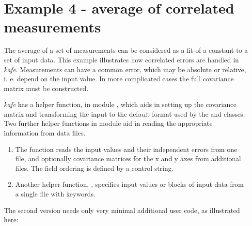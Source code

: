 \documentclass[a4paper,10pt,english]{sphinxmanual}
\begin{document}
\section{Example 4 - average of correlated measurements}
\label{index:example-4-average-of-correlated-measurements}
The average of a set of measurements can be considered as a fit
of a constant to a set of input data. This example illustrates
how correlated errors are handled in \emph{kafe}.
Measurements can have a common error, which may be absolute
or relative, i. e. depend on the input value.  In more complicated
cases the full covariance matrix must be constructed.

\emph{kafe} has a helper function,  in module ,
which aids in setting up the covariance matrix and transforming
the input to the default format used by the  and 
classes. Two further helper functions in module 
aid in reading the appropriate information from data files.
\begin{enumerate}
\item {} 
The function   reads the input values and their
independent errors from one file, and optionally covariance
matrices for the x and y axes from additional files. The field ordering
is defined by a control string.

\item {} 
Another helper function, , specifies
input values or blocks of input data from a single file with
keywords.

\end{enumerate}

The second version needs only very minimal additional user
code, as illustrated here:
\end{document}
